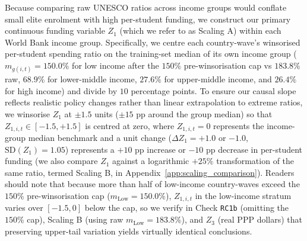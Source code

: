 \documentclass[11pt,a4paper]{article}
\begin{document}
Because comparing raw UNESCO ratios across income groups would conflate small elite enrolment with high per-student funding, we construct our primary continuous funding variable $Z_1$ (which we refer to as Scaling A) within each World Bank income group. Specifically, we centre each country-wave's winsorised per-student spending ratio on the training-set median of its own income group ($m_{g(i,t)} = 150.0\%$ for low income after the $150\%$ pre-winsorisation cap vs $183.8\%$ raw, $68.9\%$ for lower-middle income, $27.6\%$ for upper-middle income, and $26.4\%$ for high income) and divide by $10$ percentage points. To ensure our causal slope reflects realistic policy changes rather than linear extrapolation to extreme ratios, we winsorise $Z_1$ at $\pm 1.5$ units ($\pm 15$ pp around the group median) so that $Z_{1,i,t} \in [-1.5, +1.5]$ is centred at zero, where $Z_{1,i,t} = 0$ represents the income-group median benchmark and a unit change ($\Delta Z_1 = +1.0$ or $-1.0$, $\text{SD}(Z_1) = 1.05$) represents a $+10$ pp increase or $-10$ pp decrease in per-student funding (we also compare $Z_1$ against a logarithmic $+25\%$ transformation of the same ratio, termed Scaling B, in Appendix~\ref{app:scaling_comparison}). Readers should note that because more than half of low-income country-waves exceed the $150\%$ pre-winsorisation cap ($m_{\text{Low}} = 150.0\%$), $Z_{1,i,t}$ in the low-income stratum varies over $[-1.5, 0]$ below the cap, so we verify in Check \texttt{RC1b} (omitting the $150\%$ cap), Scaling B (using raw $m_{\text{Low}} = 183.8\%$), and $Z_3$ (real PPP dollars) that preserving upper-tail variation yields virtually identical conclusions.
\end{document}
